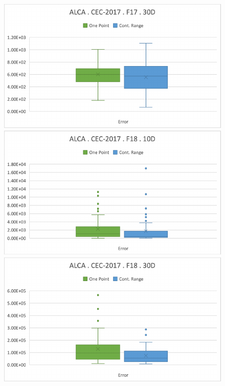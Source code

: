 \documentclass[graybox]{svmult}
\begin{document}
\begin{figure}[!ht]
\begin{minipage}[h]{0.49\linewidth}
        \end{minipage}
        \hfill
        \begin{minipage}[h]{0.49\linewidth}
            \includegraphics[width=1\linewidth]{img/fig_experiment_F17x30D.pdf} 
        \end{minipage}
        \vfill
        \vspace{0.05 cm}
        \begin{minipage}[h]{0.49\linewidth}
            \includegraphics[width=1\linewidth]{img/fig_experiment_F18x10D.pdf} 
        \end{minipage}
        \hfill
        \begin{minipage}[h]{0.49\linewidth}
            \includegraphics[width=1\linewidth]{img/fig_experiment_F18x30D.pdf} 

\end{minipage}
\end{figure}
\end{document}
